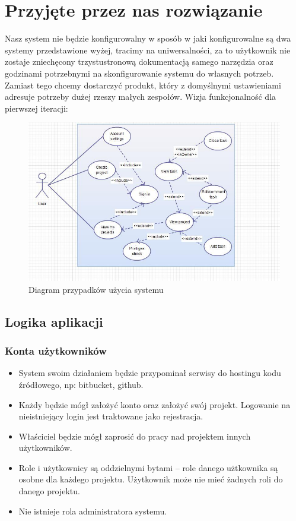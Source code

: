 \documentclass[a4paper,12pt,notitlepage]{mwrep}
\begin{document}
\section{Przyjęte przez nas rozwiązanie}
Nasz system nie będzie konfigurowalny w sposób w jaki konfigurowalne są dwa systemy przedstawione wyżej,
tracimy na uniwersalności, za to użytkownik nie zostaje zniechęcony trzystustronową dokumentacją
samego narzędzia oraz godzinami potrzebnymi na skonfigurowanie systemu do własnych potrzeb.\\
Zamiast tego chcemy dostarczyć produkt, który z domyślnymi ustawieniami adresuje potrzeby dużej rzeszy małych zespołów.\te
Wizja funkcjonalność dla pierwszej iteracji:
\begin{figure}[H]
\centering
\includegraphics[scale=0.5]{images/use_case_1.png}
\caption{Diagram przypadków użycia systemu}
\label{fig:use_case_1}
\end{figure}

\subsection{Logika aplikacji}
\subsubsection{Konta użytkowników}
\begin{itemize}
	\item	System swoim działaniem będzie przypominał serwisy do hostingu kodu źródłowego, np: bitbucket, github.
	\item	Każdy będzie mógł założyć konto oraz założyć swój projekt.
			Logowanie na nieistniejący login jest traktowane jako rejestracja.
	\item	Właściciel będzie mógł zaprosić do pracy nad projektem innych użytkowników.
	\item	Role i użytkownicy są oddzielnymi bytami -- role danego użtkownika są osobne dla każdego projektu.
			Użytkownik może nie mieć żadnych roli do danego projektu.
	\item	Nie istnieje rola administratora systemu.
\end{itemize}
\end{document}
